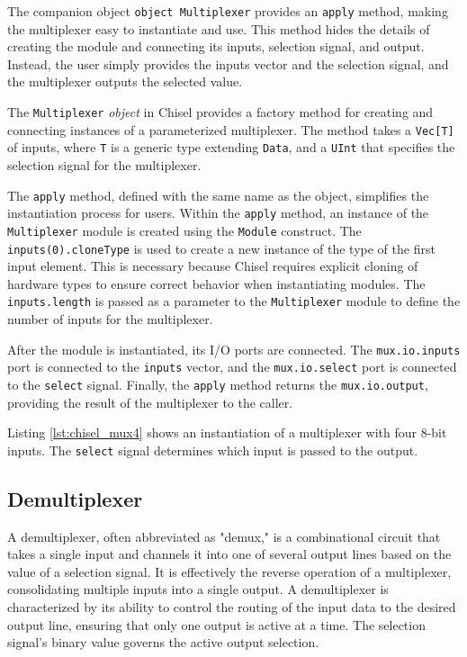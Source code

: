 {The companion object \texttt{object Multiplexer} provides an \texttt{apply} method, making the multiplexer easy to instantiate and use. This method hides the details of creating the module and connecting its inputs, selection signal, and output. Instead, the user simply provides the inputs vector and the selection signal, and the multiplexer outputs the selected value.

The \texttt{Multiplexer} \textit{object} in Chisel provides a factory method for creating and connecting instances of a parameterized multiplexer. The method takes a \texttt{Vec[T]} of inputs, where \texttt{T} is a generic type extending \texttt{Data}, and a \texttt{UInt} that specifies the selection signal for the multiplexer.

The \texttt{apply} method, defined with the same name as the object, simplifies the instantiation process for users. Within the \texttt{apply} method, an instance of the \texttt{Multiplexer} module is created using the \texttt{Module} construct. The \texttt{inputs(0).cloneType} is used to create a new instance of the type of the first input element. This is necessary because Chisel requires explicit cloning of hardware types to ensure correct behavior when instantiating modules. The \texttt{inputs.length} is passed as a parameter to the \texttt{Multiplexer} module to define the number of inputs for the multiplexer.

After the module is instantiated, its I/O ports are connected. The \texttt{mux.io.inputs} port is connected to the \texttt{inputs} vector, and the \texttt{mux.io.select} port is connected to the \texttt{select} signal. Finally, the \texttt{apply} method returns the \texttt{mux.io.output}, providing the result of the multiplexer to the caller. 


Listing \ref{lst:chisel_mux4} shows an instantiation of a multiplexer with four 8-bit inputs. The \texttt{select} signal determines which input is passed to the output. 

}%

\subsection{Demultiplexer}
A demultiplexer, often abbreviated as "demux," is a combinational circuit that takes a single input and channels it into one of several output lines based on the value of a selection signal. It is effectively the reverse operation of a multiplexer, consolidating multiple inputs into a single output. A demultiplexer is characterized by its ability to control the routing of the input data to the desired output line, ensuring that only one output is active at a time. The selection signal's binary value governs the active output selection.


